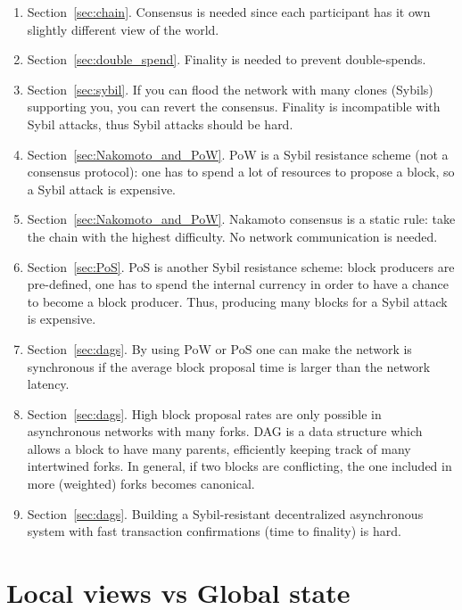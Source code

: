 \documentclass[a4paper]{article}
\begin{document}
\begin{enumerate}
 \item Section~\ref{sec:chain}. Consensus is needed since each participant has it own slightly different view of the world.
  
  \item Section~\ref{sec:double_spend}. Finality is needed to prevent double-spends.
 
 \item Section~\ref{sec:sybil}. If you can flood the network with many clones (Sybils) supporting you, you can revert the consensus. Finality is incompatible with Sybil attacks, thus Sybil attacks should be hard.

\item Section~\ref{sec:Nakomoto_and_PoW}. PoW is a Sybil resistance scheme (not a consensus protocol): one has to spend a lot of resources to propose a block, so a Sybil attack is expensive.

\item Section~\ref{sec:Nakomoto_and_PoW}. Nakamoto consensus is a static rule: take the chain with the highest difficulty. No network communication is needed.

\item Section~\ref{sec:PoS}. PoS is another Sybil resistance scheme: block producers are pre-defined, one has to spend the internal currency in order to have a chance to become a block producer. Thus, producing many blocks for a Sybil attack is expensive. 

\item Section~\ref{sec:dags}. By using PoW or PoS one can make the network is synchronous if the average block proposal time is larger than the network latency. 

\item  Section~\ref{sec:dags}. High block proposal rates are only possible in asynchronous networks with many forks. DAG is a data structure which allows a block to have many parents, efficiently keeping track of many intertwined forks. In general, if two blocks are conflicting, the one included in more (weighted) forks becomes canonical.

\item  Section~\ref{sec:dags}. Building a Sybil-resistant decentralized asynchronous system with fast transaction confirmations (time to finality) is hard.

\end{enumerate}
  
\section{Local views vs Global state }
\end{document}
